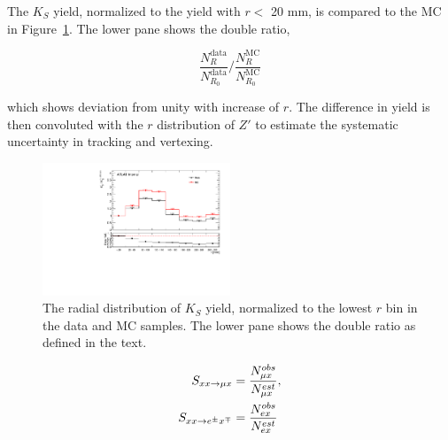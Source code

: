 The $K_{S}$ yield, normalized to the yield with $r <$ 20 mm, is compared to the MC in Figure~\ref{fig:Ks_double_ratio}. The lower pane shows the double ratio,

\begin{equation}
\frac{N^{\mathrm{data}}_{R}}{N^{\mathrm{data}}_{R_{0}}} \bigg/ \frac{N^{\mathrm{MC}}_{R}}{N^{\mathrm{MC}}_{R_{0}}}
\label{eq:ks_double_ratio}
\end{equation}

which shows deviation from unity with increase of $r$. The difference in yield is then convoluted with the $r$ distribution of $Z'$ to estimate the systematic uncertainty in tracking and vertexing.

\begin{figure}[!htb]
	\includegraphics[width=0.50\textwidth]{figures/m_syst_Ks_ratio.pdf}
	\centering
	\caption{The radial distribution of $K_{S}$ yield, normalized to the lowest $r$ bin in the data and MC samples. The lower pane shows the double ratio as defined in the text.}
	\label{fig:Ks_double_ratio}
\end{figure}



\newpage

\begin{align}
    S_{xx\rightarrow \mu x} &= \frac{N_{\mu x}^{obs}}{N_{\mu x}^{est}}, \nonumber \\
    S_{xx\rightarrow e^{\pm}x^{\mp}}   &= \frac{N_{e x}^{obs}}{ N_{e x}^{est}}
\label{eq:random_crossing_scale_factor}
\end{align}

















